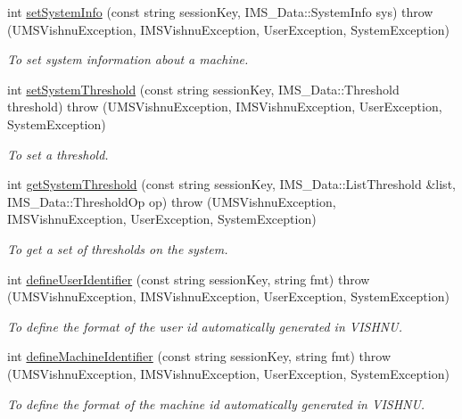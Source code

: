 \begin{DoxyCompactItemize}
int \hyperlink{namespacevishnu_a3b056eb0ec0ad9a7ac591ece3cac3dbd}{setSystemInfo} (const string sessionKey, IMS\_\-Data::SystemInfo sys)  throw (UMSVishnuException, IMSVishnuException, UserException, SystemException)
\begin{DoxyCompactList}\small\item\em To set system information about a machine. \item\end{DoxyCompactList}\item 
int \hyperlink{namespacevishnu_abdf98c34bf2ad136aa4e2cf2d8611cf0}{setSystemThreshold} (const string sessionKey, IMS\_\-Data::Threshold threshold)  throw (UMSVishnuException, IMSVishnuException, UserException, SystemException)
\begin{DoxyCompactList}\small\item\em To set a threshold. \item\end{DoxyCompactList}\item 
int \hyperlink{namespacevishnu_a19659b2087323b8bd44940afae500a98}{getSystemThreshold} (const string sessionKey, IMS\_\-Data::ListThreshold \&list, IMS\_\-Data::ThresholdOp op)  throw (UMSVishnuException, IMSVishnuException, UserException, SystemException)
\begin{DoxyCompactList}\small\item\em To get a set of thresholds on the system. \item\end{DoxyCompactList}\item 
int \hyperlink{namespacevishnu_a6388e9aa2c64ef4dfeee9a253dfc2d55}{defineUserIdentifier} (const string sessionKey, string fmt)  throw (UMSVishnuException, IMSVishnuException, UserException, SystemException)
\begin{DoxyCompactList}\small\item\em To define the format of the user id automatically generated in VISHNU. \item\end{DoxyCompactList}\item 
int \hyperlink{namespacevishnu_ae271c5ecdd758dcc4bee27ba2b9c8a3c}{defineMachineIdentifier} (const string sessionKey, string fmt)  throw (UMSVishnuException, IMSVishnuException, UserException, SystemException)
\begin{DoxyCompactList}\small\item\em To define the format of the machine id automatically generated in VISHNU. \item\end{DoxyCompactList}\item 

\end{DoxyCompactItemize}
